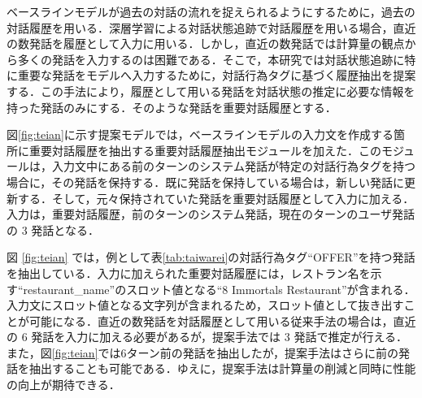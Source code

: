 ベースラインモデルが過去の対話の流れを捉えられるようにするために，過去の対話履歴を用いる．深層学習による対話状態追跡で対話履歴を用いる場合，直近の数発話を履歴として入力に用いる\cite{trade,mrc}．しかし，直近の数発話では計算量の観点から多くの発話を入力するのは困難である．そこで，本研究では対話状態追跡に特に重要な発話をモデルへ入力するために，対話行為タグに基づく履歴抽出を提案する．この手法により，履歴として用いる発話を対話状態の推定に必要な情報を持った発話のみにする．そのような発話を重要対話履歴とする．
\par

図\ref{fig:teian}に示す提案モデルでは，ベースラインモデルの入力文を作成する箇所に重要対話履歴を抽出する重要対話履歴抽出モジュールを加えた．このモジュールは，入力文中にある前のターンのシステム発話が特定の対話行為タグを持つ場合に，その発話を保持する．既に発話を保持している場合は，新しい発話に更新する．そして，元々保持されていた発話を重要対話履歴として入力に加える．入力は，重要対話履歴，前のターンのシステム発話，現在のターンのユーザ発話の 3 発話となる．
\par
図 \ref{fig:teian} では，例として表\ref{tab:taiwarei}の対話行為タグ“OFFER”を持つ発話を抽出している．入力に加えられた重要対話履歴には，レストラン名を示す“restaurant\_name”のスロット値となる“8 Immortals Restaurant”が含まれる．入力文にスロット値となる文字列が含まれるため，スロット値として抜き出すことが可能になる．直近の数発話を対話履歴として用いる従来手法の場合は，直近の 6 発話を入力に加える必要があるが，提案手法では 3 発話で推定が行える．また，図\ref{fig:teian}では6ターン前の発話を抽出したが，提案手法はさらに前の発話を抽出することも可能である．ゆえに，提案手法は計算量の削減と同時に性能の向上が期待できる．